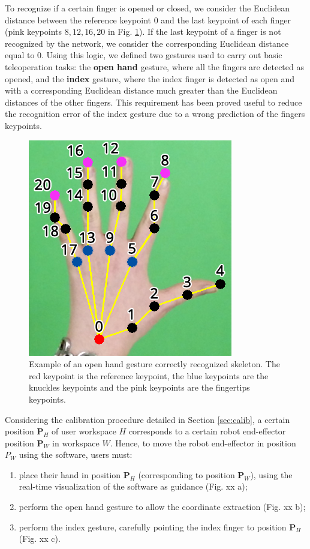 \documentclass[letterpaper, 10 pt, conference]{ieeeconf}  %
\begin{document}
To recognize if a certain finger is opened or closed, we consider the Euclidean distance between the reference keypoint $0$ and the last keypoint of each finger (pink keypoints $8, 12, 16, 20$ in Fig. \ref{fig:keypoints}). If the last keypoint of a finger is not recognized by the network, we consider the corresponding Euclidean distance equal to $0$. 
Using this logic, we defined two gestures used to carry out basic teleoperation tasks: the \textbf{open hand} gesture, where all the fingers are detected as opened, and the \textbf{index} gesture, where the index finger is detected as open and with a corresponding Euclidean distance much greater than the Euclidean distances of the other fingers. This requirement has been proved useful to reduce the recognition error of the index gesture due to a wrong prediction of the fingers keypoints.

\begin{figure} [h!]
  \centering
  \includegraphics[width=0.7\columnwidth]{figures/hand.png}
  \caption{Example of an open hand gesture correctly recognized skeleton. The red keypoint is the reference keypoint, the blue keypoints are the knuckles keypoints and the pink keypoints are the fingertips keypoints.}
  \label{fig:keypoints}
\end{figure}

Considering the calibration procedure detailed in Section \ref{sec:calib}, a certain position $\mathbf{P}_{H}$ of user workspace $H$ corresponds to a certain robot end-effector position $\mathbf{P}_{W}$ in workspace $W$. Hence, to move the robot end-effector in position $P_W$  using the software, users must: %
\begin{enumerate}
\item place their hand in position $\mathbf{P}_H$ (corresponding to position $\mathbf{P}_W$), using the real-time visualization of the software as guidance (Fig. xx a);
\item perform the open hand gesture to allow the coordinate extraction (Fig. xx b);
\item perform the index gesture, carefully pointing the index finger to position $\mathbf{P}_H$ (Fig. xx c).
\end{enumerate}
\end{document}

